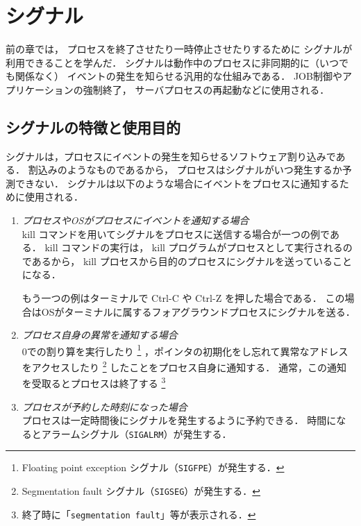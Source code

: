 \chapter{シグナル}

前の章では，
プロセスを終了させたり一時停止させたりするために
シグナルが利用できることを学んだ．
シグナルは動作中のプロセスに非同期的に（いつでも関係なく）
イベントの発生を知らせる汎用的な仕組みである．
JOB制御やアプリケーションの強制終了，
サーバプロセスの再起動などに使用される．

\section{シグナルの特徴と使用目的}
シグナルは，プロセスにイベントの発生を知らせるソフトウェア割り込みである．
割込みのようなものであるから，
プロセスはシグナルがいつ発生するか予測できない．
シグナルは以下のような場合にイベントをプロセスに通知するために使用される．

\begin{enumerate}
\item \emph{プロセスやOSがプロセスにイベントを通知する場合}\\
  kill コマンドを用いてシグナルをプロセスに送信する場合が一つの例である．
  kill コマンドの実行は，
  kill プログラムがプロセスとして実行されるのであるから，
  kill プロセスから目的のプロセスにシグナルを送っていることになる．

  もう一つの例はターミナルで Ctrl-C や Ctrl-Z を押した場合である．
  この場合はOSがターミナルに属するフォアグラウンドプロセスにシグナルを送る．

\item \emph{プロセス自身の異常を通知する場合}\\
  0での割り算を実行したり
  \footnote{Floating point exception シグナル（\texttt{SIGFPE}）が発生する．}
  ，ポインタの初期化をし忘れて異常なアドレスをアクセスしたり
  \footnote{Segmentation fault シグナル（\texttt{SIGSEG}）が発生する．}
  したことをプロセス自身に通知する．
  通常，この通知を受取るとプロセスは終了する
  \footnote{終了時に「\texttt{segmentation fault}」等が表示される．}

\item \emph{プロセスが予約した時刻になった場合}\\
  プロセスは一定時間後にシグナルを発生するように予約できる．
  時間になるとアラームシグナル（\texttt{SIGALRM}）が発生する．
\end{enumerate}

